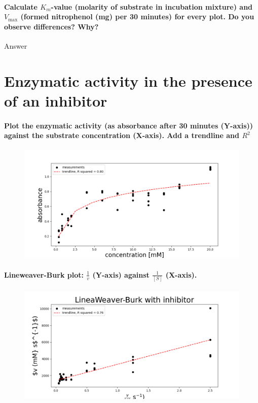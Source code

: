 \documentclass[a4paper,12pt]{article}
\begin{document}
\paragraph{Calculate $K_m$-value (molarity of substrate in incubation mixture) and $V_{\text{max}}$ (formed nitrophenol (mg) per 30 minutes) for every plot. Do you observe 
differences? Why? 
}

Answer\\

\section{Enzymatic activity in the presence of an inhibitor}

\paragraph{Plot the enzymatic activity (as absorbance after 30 minutes (Y-axis)) 
against the substrate concentration (X-axis). Add a trendline and $R^2$}

\begin{figure}[!ht]
    \includegraphics[scale=0.5]{fig3_1.png}
    \centering
\end{figure}

\paragraph{Lineweaver-Burk plot: $\frac{1}{v}$ (Y-axis) against $\frac{1}{[S]}$ (X-axis).}

\begin{figure}[!ht]
    \includegraphics[scale=0.5]{fig3_2.png}
    \centering
\end{figure}
\end{document}
